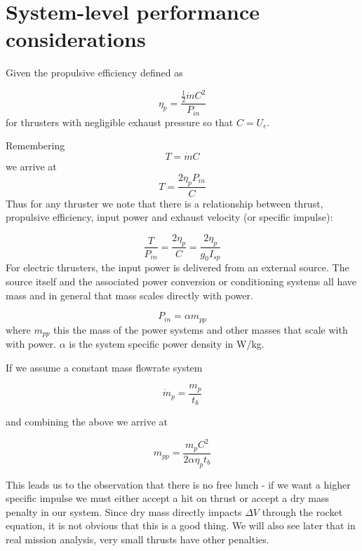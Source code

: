 \documentclass[twocolumn]{memoir} %
\begin{document}
\section{System-level performance considerations}

Given the propulsive efficiency defined as

\begin{equation*}
    \eta_p = \frac{\frac{1}{2}\dot{m}C^2}{P_{in}}
\end{equation*}
%
for thrusters with negligible exhaust pressure so that $C = U_e$.

Remembering
\begin{equation*}
    T = \dot{m}C
\end{equation*}
%
we arrive at
\begin{equation}
    T = \frac{2 \eta_p P_{in}}{C}
\end{equation}
%
Thus for any thruster we note that there is a relationship between thrust,
propulsive efficiency, input power and exhaust velocity (or specific impulse):

\begin{equation}
    \frac{T}{P_{in}} = \frac{2 \eta_p}{C} = \frac{2 \eta_p}{g_0 I_{sp}}
\end{equation}
%
For electric thrusters, the input power is delivered from an external source.
The source itself and the associated power conversion or conditioning systems
all have mass and in general that mass scales directly with power.

\begin{equation*}
    P_{in} = \alpha m_{pp}
\end{equation*}
%
where $m_{pp}$ this the mass of the power systems and other masses that scale 
with with power.  $\alpha$ is the system specific power density in W/kg.

If we assume a constant mass flowrate system

\begin{equation*}
    \dot{m}_p = \frac{m_p}{t_b}
\end{equation*}

and combining the above we arrive at

\begin{equation}
    m_{pp} = \frac{m_p C^2}{2 \alpha \eta_p t_b}
\end{equation}

This leads us to the observation that there is no free lunch - if we want a 
higher specific impulse we must either accept a hit on thrust or accept a dry
mass penalty in our system.  Since dry mass directly impacts $\Delta V$ through
the rocket equation, it is not obvious that this is a good thing.  We will also
see later that in real mission analysis, very small thrusts have other penalties.
\end{document}

